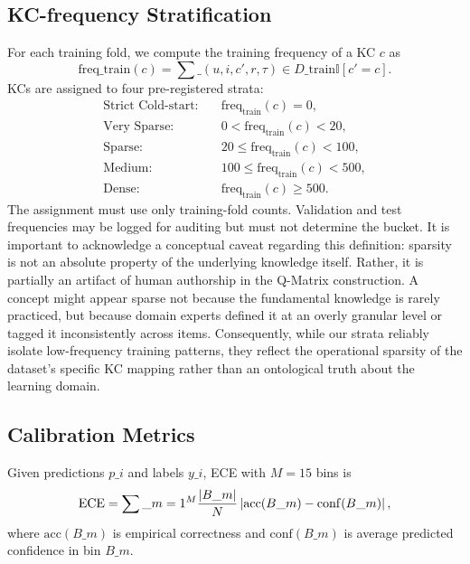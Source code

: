 \subsection{KC-frequency Stratification}
\label{sec:kc-strat}
For each training fold, we compute the training frequency of a KC $c$ as
\begin{equation}
\mathrm{freq}\_{\mathrm{train}}(c)=\sum\_{(u,i,c',r,\tau)\in D\_{\mathrm{train}}}\mathbb{I}[c'=c].
\end{equation}
KCs are assigned to four pre-registered strata:
\begin{align}
\text{Strict Cold-start:} &\quad \mathrm{freq}_{\mathrm{train}}(c) = 0,\\
\text{Very Sparse:} &\quad 0 < \mathrm{freq}_{\mathrm{train}}(c) < 20,\\
\text{Sparse:} &\quad 20 \le \mathrm{freq}_{\mathrm{train}}(c) < 100,\\
\text{Medium:} &\quad 100 \le \mathrm{freq}_{\mathrm{train}}(c) < 500,\\
\text{Dense:} &\quad \mathrm{freq}_{\mathrm{train}}(c) \ge 500.
\end{align}
The assignment must use only training-fold counts. Validation and test frequencies may be logged for auditing but must not determine the bucket. It is important to acknowledge a conceptual caveat regarding this definition: sparsity is not an absolute property of the underlying knowledge itself. Rather, it is partially an artifact of human authorship in the Q-Matrix construction. A concept might appear sparse not because the fundamental knowledge is rarely practiced, but because domain experts defined it at an overly granular level or tagged it inconsistently across items. Consequently, while our strata reliably isolate low-frequency training patterns, they reflect the operational sparsity of the dataset's specific KC mapping rather than an ontological truth about the learning domain.

\subsection{Calibration Metrics}
Given predictions $p\_i$ and labels $y\_i$, ECE with $M=15$ bins is
\begin{equation}
\mathrm{ECE} = \sum\_{m=1}^{M}\frac{|B\_m|}{N}\left|\mathrm{acc}(B\_m)-\mathrm{conf}(B\_m)\right|,
\end{equation}
where $\mathrm{acc}(B\_m)$ is empirical correctness and $\mathrm{conf}(B\_m)$ is average predicted confidence in bin $B\_m$.

